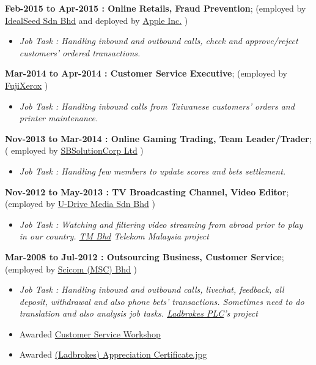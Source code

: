\documentclass[]{article}
\providecommand{\tightlist}{%
  \setlength{\itemsep}{0pt}\setlength{\parskip}{0pt}}
\begin{document}
\textbf{Feb-2015 to Apr-2015 : Online Retails, Fraud Prevention};
(employed by \href{http://www.idealseed.com/}{IdealSeed Sdn Bhd} and
deployed by \href{http://www.apple.com}{Apple Inc.} )

\begin{itemize}
\tightlist
\item
  \emph{Job Task : Handling inbound and outbound calls, check and
  approve/reject customers' ordered transactions.}
\end{itemize}

\textbf{Mar-2014 to Apr-2014 : Customer Service Executive}; (employed by
\href{https://www.fujixerox.com}{FujiXerox} )

\begin{itemize}
\tightlist
\item
  \emph{Job Task : Handling inbound calls from Taiwanese customers'
  orders and printer maintenance.}
\end{itemize}

\textbf{Nov-2013 to Mar-2014 : Online Gaming Trading, Team
Leader/Trader}; ( employed by
\href{http://www.gb-links.com/}{SBSolutionCorp Ltd} )

\begin{itemize}
\tightlist
\item
  \emph{Job Task : Handling few members to update scores and bets
  settlement.}
\end{itemize}

\textbf{Nov-2012 to May-2013 : TV Broadcasting Channel, Video Editor};
(employed by \href{http://www.udrive-media.com/}{U-Drive Media Sdn Bhd}
)

\begin{itemize}
\tightlist
\item
  \emph{Job Task : Watching and filtering video streaming from abroad
  prior to play in our country. \href{https://tm.com.my/\#/explore}{TM
  Bhd} Telekom Malaysia project}
\end{itemize}

\textbf{Mar-2008 to Jul-2012 : Outsourcing Business, Customer Service};
(employed by \href{http://www.scicom-intl.com/}{Scicom (MSC) Bhd} )

\begin{itemize}
\tightlist
\item
  \emph{Job Task : Handling inbound and outbound calls, livechat,
  feedback, all deposit, withdrawal and also phone bets' transactions.
  Sometimes need to do translation and also analysis job tasks.
  \href{http://www.ladbrokesplc.com/}{Ladbrokes PLC}'s project}
\item
  Awarded
  \href{https://raw.githubusercontent.com/scibrokes/owner/master/documents/Scicom\%20CS\%20Workshop.jpg}{Customer
  Service Workshop}
\item
  Awarded
  \href{https://raw.githubusercontent.com/scibrokes/owner/master/documents/Scicom\%20Appreciation\%20Certificate.jpg}{(Ladbrokes)
  Appreciation Certificate.jpg}
\end{itemize}
\end{document}
